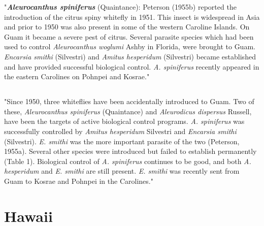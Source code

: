 \documentclass[]{scrartcl}
\begin{document}
"\textit{\textbf{Aleurocanthus spiniferus}} (Quaintance): Peterson (1955b) reported the introduction of the citrus spiny whitefly in 1951. This insect is widespread in Asia and prior to 1950 was also present in some of the western Caroline Islands. On Guam it became a severe pest of citrus. Several parasite species which had been used to control \textit{Aleurocanthus woglumi} Ashby in Florida, were brought to Guam. \textit{Encarsia smithi} (Silvestri) and \textit{Amitus hesperidum} (Silvestri) became established and have provided successful biological control. \textit{A. spiniferus} recently appeared in the eastern Carolines on Pohnpei and Kosrae."

\subsection{}

"Since 1950, three whiteflies have been accidentally introduced to Guam. Two of these, \textit{Aleurocanthus spiniferus} (Quaintance) and \textit{Aleurodicus dispersus} Russell, have been the targets of active biological control programs. \textit{A. spiniferus} was successfully controlled by \textit{Amitus hesperidum} Silvestri and \textit{Encarsia smithi} (Silvestri). \textit{E. smithi} was the more important parasite of the two (Peterson, 1955a). Several other species were introduced but failed to establish permanently (Table 1). Biological control of \textit{A. spiniferus} continues to be good, and both \textit{A. hesperidum} and \textit{E. smithi} are still present. \textit{E. smithi} was recently sent from Guam to Kosrae and Pohnpei in the Carolines."

\subsection{}

\subsection{}

\section{Hawaii}

\subsection{}
\end{document}
